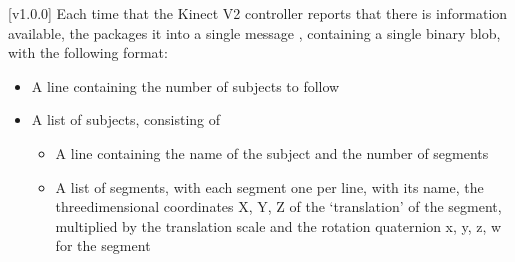 [v1.0.0]
Each time that the Kinect V2 controller reports that there is information
available, the  packages it into a single message
\openSq{}\closeSq, containing a single binary blob, with the following
format:
\begin{itemize}
\item A line containing the number of subjects to follow
\item\exSp{}A list of subjects, consisting of
\begin{itemize}
\item A line containing the name of the subject and the number of segments
\item\exSp{}A list of segments, with each segment one per line, with its name, the
three\longDash{}dimensional coordinates \openSq{}X, Y, Z\closeSq{} of the `translation'
of the segment, multiplied by the translation scale and the rotation quaternion
\openSq{}x, y, z, w\closeSq{} for the segment
\end{itemize}
\end{itemize}
\primaryEnd{}
